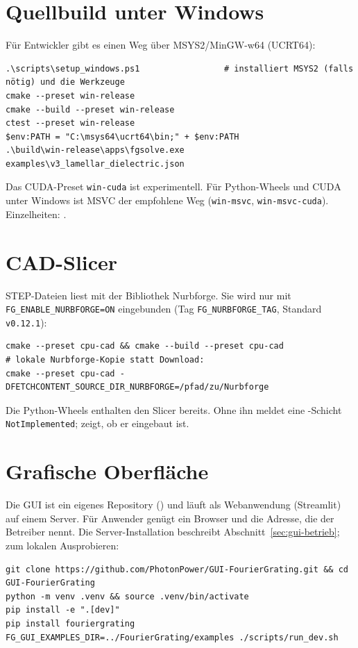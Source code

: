 \section{Quellbuild unter Windows}\label{sec:inst-windows}
%
Für Entwickler gibt es einen Weg über MSYS2/MinGW-w64 (UCRT64):
\begin{lstlisting}[style=shell]
.\scripts\setup_windows.ps1                 # installiert MSYS2 (falls nötig) und die Werkzeuge
cmake --preset win-release
cmake --build --preset win-release
ctest --preset win-release
$env:PATH = "C:\msys64\ucrt64\bin;" + $env:PATH
.\build\win-release\apps\fgsolve.exe examples\v3_lamellar_dielectric.json
\end{lstlisting}
Das CUDA-Preset \texttt{win-cuda} ist experimentell. Für Python-Wheels und CUDA unter Windows ist MSVC der
empfohlene Weg (\texttt{win-msvc}, \texttt{win-msvc-cuda}). Einzelheiten: .

\section{CAD-Slicer}\label{sec:inst-cad}
%
STEP-Dateien liest \FG{} mit der Bibliothek Nurbforge. Sie wird nur mit \texttt{FG\_ENABLE\_NURBFORGE=ON}
eingebunden (Tag \texttt{FG\_NURBFORGE\_TAG}, Standard \texttt{v0.12.1}):
\begin{lstlisting}[style=shell]
cmake --preset cpu-cad && cmake --build --preset cpu-cad
# lokale Nurbforge-Kopie statt Download:
cmake --preset cpu-cad -DFETCHCONTENT_SOURCE_DIR_NURBFORGE=/pfad/zu/Nurbforge
\end{lstlisting}
Die Python-Wheels enthalten den Slicer bereits. Ohne ihn meldet eine -Schicht \texttt{NotImplemented};
 zeigt, ob er eingebaut ist.

\section{Grafische Oberfläche}\label{sec:inst-gui}
Die GUI ist ein eigenes Repository () und läuft als Webanwendung
(Streamlit) auf einem Server. Für Anwender genügt ein Browser und die Adresse, die der Betreiber nennt.
Die Server-Installation beschreibt Abschnitt~\ref{sec:gui-betrieb}; zum lokalen Ausprobieren:
\begin{lstlisting}[style=shell]
git clone https://github.com/PhotonPower/GUI-FourierGrating.git && cd GUI-FourierGrating
python -m venv .venv && source .venv/bin/activate
pip install -e ".[dev]"
pip install fouriergrating
FG_GUI_EXAMPLES_DIR=../FourierGrating/examples ./scripts/run_dev.sh
\end{lstlisting}

